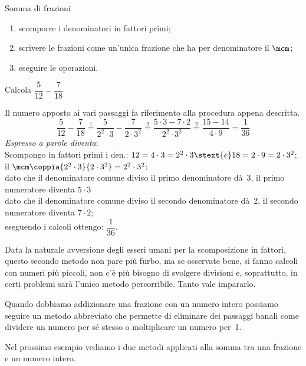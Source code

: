 \begin{procedura}{Somma di frazioni}{}
\begin{enumerate} [nosep]
\item scomporre i denominatori in fattori primi;
\item scrivere le frazioni come un'unica frazione che ha per denominatore il 
\(\mcm\);
\item eseguire le operazioni.
\end{enumerate}
\end{procedura}

\begin{esempio}{}{}
Calcola \(\dfrac{5}{12} - \dfrac{7}{18}\)

Il numero apposto ai vari passaggi fa riferimento alla procedura appena 
descritta.
\[\dfrac{5}{12} - \dfrac{7}{18} \stackrel{1}{=} 
  \dfrac{5}{2^2 \cdot 3} - \dfrac{7}{2 \cdot 3^2} \stackrel{2}{=} 
  \dfrac{5 \cdot 3 - 7 \cdot 2}{2^2 \cdot 3^2} \stackrel{2}{=} 
  \dfrac{15 - 14}{4 \cdot 9} = \dfrac{1}{36}\]
\emph{Espresso a parole diventa}:\\ 
Scompongo in fattori primi i den.:
\(12 = 4 \cdot 3 = 2^2 \cdot 3 \stext{ e } 18 = 2 \cdot 9 = 2 \cdot 3^2\);\\
il \(\mcm \coppia{2^2 \cdot 3}{2 \cdot 3^2} = 2^2 \cdot 3^2\);\\
dato che il denominatore comune diviso il primo denominatore dà~3, 
il primo numeratore diventa \(5 \cdot 3\)\\
dato che il denominatore comune diviso il secondo denominatore dà~2, 
il secondo numeratore diventa \(7 \cdot 2\);\\
eseguendo i calcoli ottengo: \(\dfrac{1}{36}\).
\end{esempio}

\begin{osservazione}{}{}
Data la naturale avversione degli esseri umani per la scomposizione in 
fattori, questo secondo metodo non pare più furbo, ma se osservate bene, si 
fanno calcoli con numeri più piccoli, non c'è più bisogno di svolgere 
divisioni e, soprattutto, in certi problemi sarà l'unico metodo 
percorribile. Tanto vale impararlo.
\end{osservazione}

Quando dobbiamo addizionare una frazione con un numero intero possiamo 
seguire un metodo abbreviato che permette di eliminare dei passaggi banali 
come dividere un numero per sé stesso o moltiplicare un numero per~1.

Nel prossimo esempio vediamo i due metodi applicati alla somma tra una 
frazione e un numero intero.

